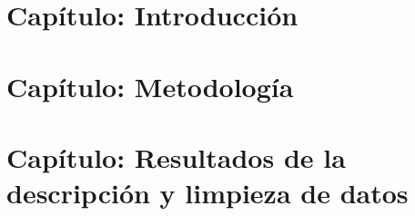 \documentclass[11pt,a4paper,twoside]{tesis}
\begin{document}
\def\titulo{Magister en explotación de datos y descubrimiento del conocimiento}

\def\autor{Ing. María del Pilar Ávila Williams}
\def\tituloTesis{Aplicación de técnicas de graph mining para buscar patrones
 en la lista de problemas de la historia clínica del Hospital Italiano de Buenos Aires.}
\def\runtitulo{Aplicación de técnicas de graph mining para buscar patrones en la lista de problemas de la historia clínica del Hospital Italiano de Buenos Aires}
\def\runtitle{Application of graph mining techniques to look for patterns in the list of problems in the medical history of the Hospital Italiano de Buenos Aires}
\def\director{Dr. Marcelo Soria}
\def\lugar{Buenos Aires, 2018}


\frontmatter
\pagestyle{empty}


\cleardoublepage


\cleardoublepage

\cleardoublepage

\cleardoublepage
\setcounter{tocdepth}{3}
\setcounter{secnumdepth}{3}
\tableofcontents
\renewcommand{\listfigurename}{Listado de figuras}
\listoffigures
 
\renewcommand{\listtablename}{Listado de tablas}
\listoftables


\printglossary[type=\acronymtype,title={Abreviaturas}]
\printglossary

\cleardoublepage
\mainmatter
\pagestyle{headings}


\chapter{Capítulo: Introducción}


\chapter{Capítulo: Metodología}


\chapter{Capítulo: Resultados de la descripción y limpieza de datos}

 
\end{document}
